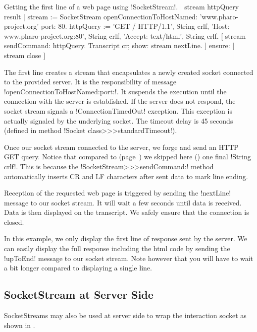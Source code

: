 \documentclass[a4paper,10pt,twoside]{book}
\begin{document}
\begin{script}{Getting the first line of a web page using \ct!SocketStream!.}
	| stream httpQuery result |
	stream := SocketStream 
			openConnectionToHostNamed: 'www.pharo-project.org' 
			port: 80.
	httpQuery := 'GET / HTTP/1.1', String crlf, 
		'Host: www.pharo-project.org:80', String crlf, 
		'Accept: text/html', String crlf.
	[
		stream sendCommand: httpQuery.
		Transcript cr; show: stream nextLine.
	] ensure: [
		stream close ]
\end{script}

The first line creates a stream that encapsulates a newly created socket connected to the provided server.
It is the responsibility of message \ct!openConnectionToHostNamed:port:!.
It suspends the execution until the connection with the server is established.
If the server does not respond, the socket stream signals a \ct!ConnectionTimedOut! exception.
This exception is actually signaled by the underlying socket.
The timeout delay is 45 seconds (defined in method \ct!Socket class>>>standardTimeout!).

Once our socket stream  connected to the server, we forge and send an HTTP GET query.
Notice that compared to  (page~\pageref{scr:script:closeAndDestroy}) we skipped here () one final \ct!String crlf!.
This is because the \ct!SocketStream>>>sendCommand:! method automatically inserts CR and LF characters after sent data to mark line ending.

Reception of the requested web page is triggered by sending the \ct!nextLine! message to our socket stream.
It will wait  a few seconds until data is received.
Data is then displayed on the transcript.
We safely ensure that the connection is closed.

In this example, we only display the first line of response sent by the server.
We can easily display the full response including the html code by sending the \ct!upToEnd! message to our socket stream.
Note however that you will have to wait a bit longer compared to displaying a single line.

\subsection{SocketStream at Server Side}
SocketStreams may also be used at server side to wrap the interaction socket as shown in .
\end{document}
